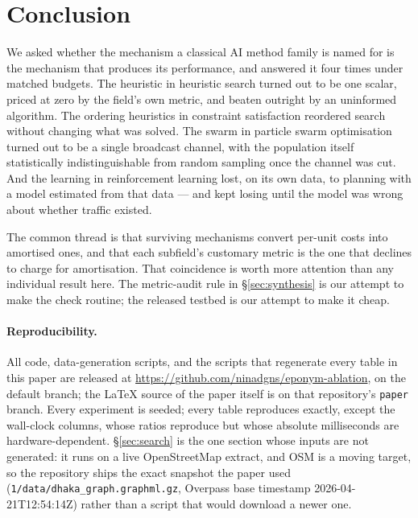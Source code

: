 \documentclass[11pt]{article}
\begin{document}
\section{Conclusion}

We asked whether the mechanism a classical AI method family is named for is the mechanism that
produces its performance, and answered it four times under matched budgets. The heuristic in
heuristic search turned out to be one scalar, priced at zero by the field's own metric, and beaten
outright by an uninformed algorithm. The ordering heuristics in constraint satisfaction reordered
search without changing what was solved. The swarm in particle swarm optimisation turned out to be
a single broadcast channel, with the population itself statistically indistinguishable from random
sampling once the channel was cut. And the learning in reinforcement learning lost, on its own data,
to planning with a model estimated from that data --- and kept losing until the model was wrong
about whether traffic existed.

The common thread is that surviving mechanisms convert per-unit costs into amortised ones, and that
each subfield's customary metric is the one that declines to charge for amortisation. That
coincidence is worth more attention than any individual result here. The metric-audit rule in
\S\ref{sec:synthesis} is our attempt to make the check routine; the released testbed is our attempt
to make it cheap.

\paragraph{Reproducibility.} All code, data-generation scripts, and the scripts that regenerate
every table in this paper are released at
\url{https://github.com/ninadgns/eponym-ablation}, on the default branch; the LaTeX source of the
paper itself is on that repository's \texttt{paper} branch. Every experiment is seeded; every table
reproduces exactly, except the wall-clock columns, whose ratios reproduce but whose absolute
milliseconds are hardware-dependent. \S\ref{sec:search} is the one section whose inputs are not
generated: it runs on a live OpenStreetMap extract, and OSM is a moving target, so the repository
ships the exact snapshot the paper used (\texttt{1/data/dhaka\_graph.graphml.gz}, Overpass base
timestamp 2026-04-21T12:54:14Z) rather than a script that would download a newer one.



\end{document}
